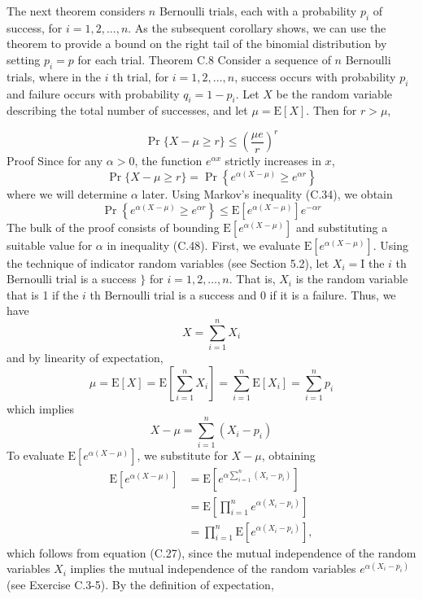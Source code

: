 \documentclass[lang=cn,newtx,10pt,scheme=chinese]{elegantbook}
\begin{document}
The next theorem considers $n$ Bernoulli trials, each with a probability $p_i$ of success, for $i=1,2, \ldots, n$. As the subsequent corollary shows, we can use the theorem to provide a bound on the right tail of the binomial distribution by setting $p_i=p$ for each trial.
Theorem C.8
Consider a sequence of $n$ Bernoulli trials, where in the $i$ th trial, for $i=1,2, \ldots, n$, success occurs with probability $p_i$ and failure occurs with probability $q_i=1-p_i$. Let $X$ be the random variable describing the total number of successes, and let $\mu=\mathrm{E}[X]$. Then for $r>\mu$,

$$
\operatorname{Pr}\{X-\mu \geq r\} \leq\left(\frac{\mu e}{r}\right)^r
$$
Proof Since for any $\alpha>0$, the function $e^{\alpha x}$ strictly increases in $x$,
$$
\operatorname{Pr}\{X-\mu \geq r\}=\operatorname{Pr}\left\{e^{\alpha(X-\mu)} \geq e^{\alpha r}\right\}
$$
where we will determine $\alpha$ later. Using Markov's inequality (C.34), we obtain
$$
\operatorname{Pr}\left\{e^{\alpha(X-\mu)} \geq e^{\alpha r}\right\} \leq \mathrm{E}\left[e^{\alpha(X-\mu)}\right] e^{-\alpha r}
$$
The bulk of the proof consists of bounding $\mathrm{E}\left[e^{\alpha(X-\mu)}\right]$ and substituting a suitable value for $\alpha$ in inequality (C.48). First, we evaluate $\mathrm{E}\left[e^{\alpha(X-\mu)}\right]$. Using the technique of indicator random variables (see Section 5.2), let $X_i=\mathrm{I}$ the $i$ th Bernoulli trial is a success $\}$ for $i=1,2, \ldots, n$. That is, $X_i$ is the random variable that is 1 if the $i$ th Bernoulli trial is a success and 0 if it is a failure. Thus, we have
$$
X=\sum_{i=1}^n X_i
$$
and by linearity of expectation,
$$
\mu=\mathrm{E}[X]=\mathrm{E}\left[\sum_{i=1}^n X_i\right]=\sum_{i=1}^n \mathrm{E}\left[X_i\right]=\sum_{i=1}^n p_i
$$
which implies
$$
X-\mu=\sum_{i=1}^n\left(X_i-p_i\right)
$$
To evaluate $\mathrm{E}\left[e^{\alpha(X-\mu)}\right]$, we substitute for $X-\mu$, obtaining
$$
\begin{aligned}
\mathrm{E}\left[e^{\alpha(X-\mu)}\right] & =\mathrm{E}\left[e^{\alpha \sum_{i=1}^n\left(X_i-p_i\right)}\right] \\
& =\mathrm{E}\left[\prod_{i=1}^n e^{\alpha\left(X_i-p_i\right)}\right] \\
& =\prod_{i=1}^n \mathrm{E}\left[e^{\alpha\left(X_i-p_i\right)}\right],
\end{aligned}
$$
which follows from equation (C.27), since the mutual independence of the random variables $X_i$ implies the mutual independence of the random variables $e^{\alpha\left(X_i-p_i\right)}$ (see Exercise C.3-5). By the definition of expectation,
\end{document}
